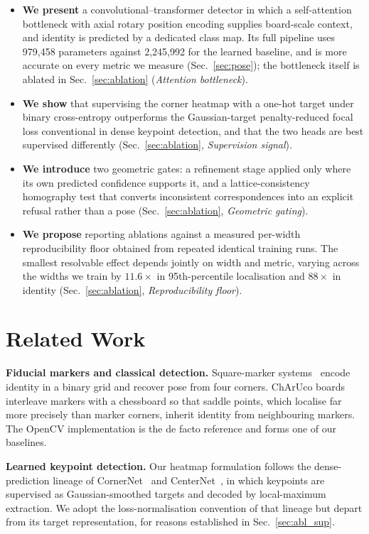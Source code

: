 \documentclass[10pt,twocolumn,letterpaper]{article}
\begin{document}
\begin{itemize}\itemsep2pt \parskip0pt 
\item \textbf{We present} a convolutional--transformer detector in which a self-attention
bottleneck with axial rotary position encoding supplies board-scale context, and identity is
predicted by a dedicated class map. Its full pipeline uses 979,458 parameters against 2,245,992
for the learned baseline, and is more accurate on every metric we measure (Sec.~\ref{sec:pose});
the bottleneck itself is ablated in Sec.~\ref{sec:ablation} (\emph{Attention bottleneck}).
\item \textbf{We show} that supervising the corner heatmap with a one-hot target under binary
cross-entropy outperforms the Gaussian-target penalty-reduced focal loss conventional in dense
keypoint detection, and that the two heads are best supervised differently
(Sec.~\ref{sec:ablation}, \emph{Supervision signal}).
\item \textbf{We introduce} two geometric gates: a refinement stage applied only where its own
predicted confidence supports it, and a lattice-consistency homography test that converts
inconsistent correspondences into an explicit refusal rather than a pose
(Sec.~\ref{sec:ablation}, \emph{Geometric gating}).
\item \textbf{We propose} reporting ablations against a measured per-width reproducibility floor
obtained from repeated identical training runs. The smallest resolvable effect depends jointly on
width and metric, varying across the widths we train by $11.6\times$ in 95th-percentile
localisation and $88\times$ in identity (Sec.~\ref{sec:ablation},
\emph{Reproducibility floor}).
\end{itemize}

\section{Related Work}

\textbf{Fiducial markers and classical detection.}
Square-marker systems~\cite{artoolkit,artag,apriltag,aruco} encode identity in a binary grid and
recover pose from four corners. ChArUco boards interleave markers with a chessboard so that saddle
points, which localise far more precisely than marker corners, inherit identity from neighbouring
markers. The OpenCV implementation is the de facto reference and forms one of our baselines.

\textbf{Learned keypoint detection.}
Our heatmap formulation follows the dense-prediction lineage of CornerNet~\cite{cornernet} and
CenterNet~\cite{centernet}, in which keypoints are supervised as Gaussian-smoothed targets and
decoded by local-maximum extraction. We adopt the loss-normalisation convention of that lineage but
depart from its target representation, for reasons established in Sec.~\ref{sec:abl_sup}.
\end{document}
